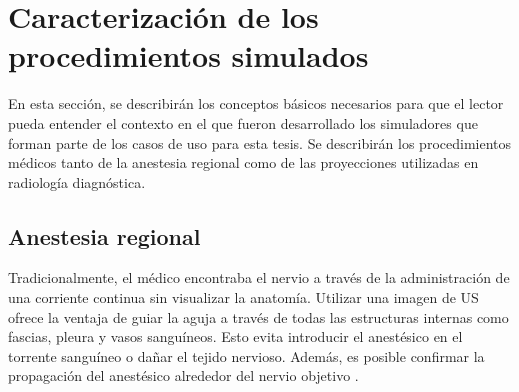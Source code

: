 \section{Caracterización de los procedimientos simulados}

En esta sección, se describirán los conceptos básicos necesarios para que el lector pueda entender el contexto en el que fueron desarrollado los simuladores que forman parte de los casos de uso para esta tesis. Se describirán los procedimientos médicos tanto de la anestesia regional como de las proyecciones utilizadas en radiología diagnóstica.

\subsection{Anestesia regional}
\label{art:ra}



Tradicionalmente, el médico encontraba el nervio a través de la administración de una corriente continua sin visualizar la anatomía. Utilizar una imagen de \ac{US} ofrece la ventaja de guiar la aguja a través de todas las estructuras internas como fascias, pleura y vasos sanguíneos. Esto evita introducir el anestésico en el torrente sanguíneo o dañar el tejido nervioso. Además, es posible confirmar la propagación del anestésico alrededor del nervio objetivo .  

